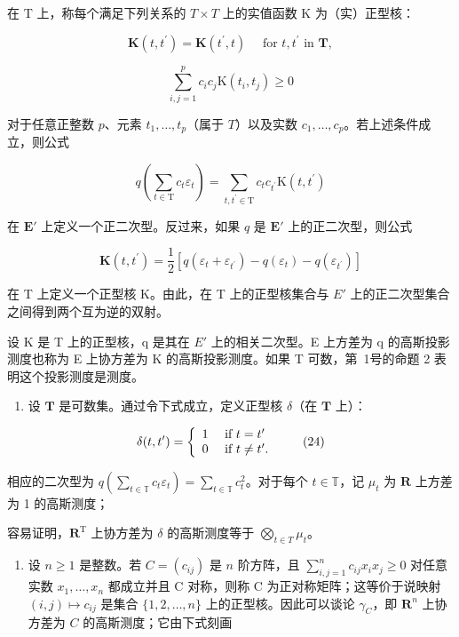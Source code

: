 在 T 上，称每个满足下列关系的 \(T \times T\) 上的实值函数 K 为（实）正型核：

\[
\mathbf {K} (t, t ^ {\prime}) = \mathbf {K} (t ^ {\prime}, t) \quad \text { for } t, t ^ {\prime} \text { in } \mathbf {T},\tag{20}
\]

\[
\sum_ {i, j = 1} ^ {p} c _ {i} c _ {j} \mathrm{K} (t _ {i}, t _ {j}) \geqslant 0\tag{21}
\]

 对于任意正整数 \(p\)、元素 \(t_1, \ldots, t_p\)（属于 \(T\)）以及实数 \(c_1, \ldots, c_p\)。若上述条件成立，则公式

\[
q \left(\sum_ {t \in \mathrm{T}} c _ {t} \varepsilon_ {t}\right) = \sum_ {t, t ^ {\prime} \in \mathrm{T}} c _ {t} c _ {t ^ {\prime}} \mathrm{K} (t, t ^ {\prime})\tag{22}
\]

在 \(\mathbf{E}'\) 上定义一个正二次型。反过来，如果 \(q\) 是 \(\mathbf{E}'\) 上的正二次型，则公式

\[
\mathbf {K} (t, t ^ {\prime}) = \frac {1}{2} [ q (\varepsilon_ {t} + \varepsilon_ {t ^ {\prime}}) - q (\varepsilon_ {t}) - q (\varepsilon_ {t ^ {\prime}}) ]\tag{23}
\]

在 T 上定义一个正型核 K。由此，在 T 上的正型核集合与 \(E'\) 上的正二次型集合之间得到两个互为逆的双射。

设 K 是 T 上的正型核，q 是其在 \(E'\) 上的相关二次型。E 上方差为 q 的高斯投影测度也称为 E 上协方差为 K 的高斯投影测度。如果 T 可数，第~1号的命题 2 表明这个投影测度是测度。

\begin{enumerate}
\def\labelenumi{\arabic{enumi})}
\setcounter{enumi}{2}
\tightlist
\item
  设 \(\mathbf{T}\) 是可数集。通过令下式成立，定义正型核 \(\delta\)（在 \(\mathbf{T}\) 上）：
\end{enumerate}

\[
\delta (t, t ^ {\prime}) = \left\{ \begin{array}{l l} 1 & \text { if } t = t ^ {\prime} \\ 0 & \text { if } t \neq t ^ {\prime}. \end{array} \right.\tag{24}
\]

相应的二次型为 \(q\left(\sum_{t \in \mathbb{T}} c_t \varepsilon_t\right) = \sum_{t \in \mathbb{T}} c_t^2\)。对于每个 \(t \in \mathbb{T}\)，记 \(\mu_t\) 为 \(\mathbf{R}\) 上方差为 1 的高斯测度；

容易证明，\(\mathbf{R}^{\mathrm{T}}\) 上协方差为 \(\delta\) 的高斯测度等于 \(\bigotimes_{t\in T}\mu_t\)。

\begin{enumerate}
\def\labelenumi{\arabic{enumi})}
\setcounter{enumi}{3}
\tightlist
\item
  设 \(n \geqslant 1\) 是整数。若 \(C = (c_{ij})\) 是 \(n\) 阶方阵，且 \(\sum_{i,j=1}^{n} c_{ij} x_i x_j \geqslant 0\) 对任意实数 \(x_1, \ldots, x_n\) 都成立并且 C 对称，则称 C 为正对称矩阵；这等价于说映射 \((i,j) \mapsto c_{ij}\) 是集合 \(\{1,2,\ldots,n\}\) 上的正型核。因此可以谈论 \(\gamma_C\)，即 \(\mathbf{R}^n\) 上协方差为 \(C\) 的高斯测度；它由下式刻画
\end{enumerate}

